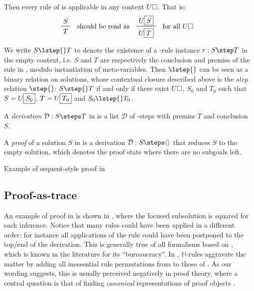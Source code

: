 Then every rule of  is applicable in any
context $U\square$. That is:
$$\vcenter{\R{S}{T}} \quad \text{should be read as} \quad
\vcenter{\R{U\select{S}}{U\select{T}}} \quad \text{for all $U\hole$}$$

\begin{definition}[\kl{BJ}-step]
We write $S \lstep{} T$ to denote the existence of a -rule instance
$\irule{r}{S}{T}$ in the empty context, i.e. $S$ and $T$ are respectively the
conclusion and premiss of the rule {} in , modulo
instantiation of meta-variables.
Then $\lstep{}$ can be seen as a binary relation on solutions, whose contextual
closure described above is the \emph{step} relation $\step{}$: $S \step{} T$ if
and only if there exist $U\square$, $S_0$ and $T_0$ such that $S =
U\fbox{$S_0$}$, $T = U\fbox{$T_0$}$ and $S_0 \lstep{} T_0$.
\end{definition}

\begin{definition}[\kl{BJ}-derivation]

A \emph{derivation} $\deriv{\mathcal{D}}{S}{T}$ in  is a list
$\mathcal{D}$ of -steps with premiss $T$ and conclusion $S$.
\end{definition}

\begin{definition}[\kl{BJ}-proof]
A \emph{proof} of a solution $S$ in  is a derivation
$\deriv{\mathcal{D}}{S}{\piq{}}$ that reduces $S$ to the empty solution, which
denotes the proof state where there are no subgoals left.
\end{definition}

\begin{marginfigure}

\caption{Example of sequent-style proof in }
\end{marginfigure}

\subsection{Proof-as-trace}

An example of proof in  is shown in , where the
focused subsolution is squared for each inference. Notice that many rules could
have been applied in a different order: for instance all applications of the
{} rule could have been postponed to the top/end of the derivation.
This is generally true of all formalisms based on , which is known in the
 literature for its ``bureaucracy''. In ,
$\mathbb{H}$-rules aggravate the matter by adding all inessential rule
permutations from  to those of . As our wording suggests,
this is usually perceived negatively in  proof theory, where a
central question is that of finding \emph{canonical} representations of proof
objects .

